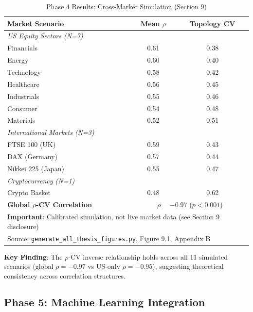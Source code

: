 \documentclass[12pt,letterpaper]{article}
\begin{document}
\begin{table}[H]
\centering
\caption{Phase 4 Results: Cross-Market Simulation (Section 9)}
\label{tab:phase4}
\begin{tabular}{@{}lcc@{}}
\toprule
\textbf{Market Scenario} & \textbf{Mean $\rho$} & \textbf{Topology CV} \\
\midrule
\multicolumn{3}{l}{\textit{US Equity Sectors (N=7)}} \\
\quad Financials & 0.61 & 0.38 \\
\quad Energy & 0.60 & 0.40 \\
\quad Technology & 0.58 & 0.42 \\
\quad Healthcare & 0.56 & 0.45 \\
\quad Industrials & 0.55 & 0.46 \\
\quad Consumer & 0.54 & 0.48 \\
\quad Materials & 0.52 & 0.51 \\
\midrule
\multicolumn{3}{l}{\textit{International Markets (N=3)}} \\
\quad FTSE 100 (UK) & 0.59 & 0.43 \\
\quad DAX (Germany) & 0.57 & 0.44 \\
\quad Nikkei 225 (Japan) & 0.55 & 0.47 \\
\midrule
\multicolumn{3}{l}{\textit{Cryptocurrency (N=1)}} \\
\quad Crypto Basket & 0.48 & 0.62 \\
\midrule
\textbf{Global $\rho$-CV Correlation} & \multicolumn{2}{c}{$\rho = -0.97$ ($p < 0.001$)} \\
\bottomrule
\multicolumn{3}{l}{\footnotesize \textbf{Important}: Calibrated simulation, not live market data (see Section 9 disclosure)} \\
\multicolumn{3}{l}{\footnotesize Source: \texttt{generate\_all\_thesis\_figures.py}, Figure 9.1, Appendix B}
\end{tabular}
\end{table}

\textbf{Key Finding}: The $\rho$-CV inverse relationship holds across all 11 simulated scenarios (global $\rho = -0.97$ vs US-only $\rho = -0.95$), suggesting theoretical consistency across correlation structures.

\subsection{Phase 5: Machine Learning Integration}
\end{document}
